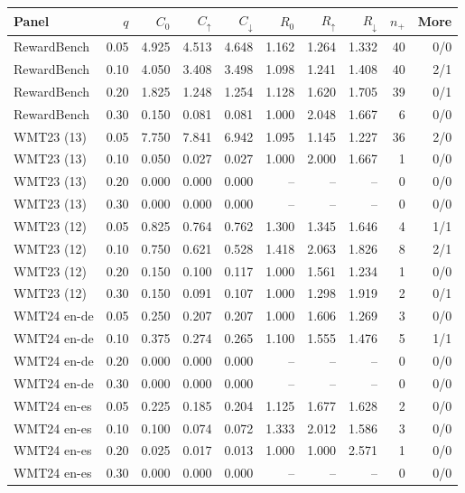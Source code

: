 \begin{table}[t]
\centering\small
\begin{tabular}{lrrrrrrrrr}
\toprule
Panel & $q$ & $C_0$ & $C_\uparrow$ & $C_\downarrow$ & $R_0$ & $R_\uparrow$ & $R_\downarrow$ & $n_+$ & More \\
\midrule
RewardBench & 0.05 & 4.925 & 4.513 & 4.648 & 1.162 & 1.264 & 1.332 & 40 & 0/0 \\
RewardBench & 0.10 & 4.050 & 3.408 & 3.498 & 1.098 & 1.241 & 1.408 & 40 & 2/1 \\
RewardBench & 0.20 & 1.825 & 1.248 & 1.254 & 1.128 & 1.620 & 1.705 & 39 & 0/1 \\
RewardBench & 0.30 & 0.150 & 0.081 & 0.081 & 1.000 & 2.048 & 1.667 & 6 & 0/0 \\
WMT23 (13) & 0.05 & 7.750 & 7.841 & 6.942 & 1.095 & 1.145 & 1.227 & 36 & 2/0 \\
WMT23 (13) & 0.10 & 0.050 & 0.027 & 0.027 & 1.000 & 2.000 & 1.667 & 1 & 0/0 \\
WMT23 (13) & 0.20 & 0.000 & 0.000 & 0.000 & -- & -- & -- & 0 & 0/0 \\
WMT23 (13) & 0.30 & 0.000 & 0.000 & 0.000 & -- & -- & -- & 0 & 0/0 \\
WMT23 (12) & 0.05 & 0.825 & 0.764 & 0.762 & 1.300 & 1.345 & 1.646 & 4 & 1/1 \\
WMT23 (12) & 0.10 & 0.750 & 0.621 & 0.528 & 1.418 & 2.063 & 1.826 & 8 & 2/1 \\
WMT23 (12) & 0.20 & 0.150 & 0.100 & 0.117 & 1.000 & 1.561 & 1.234 & 1 & 0/0 \\
WMT23 (12) & 0.30 & 0.150 & 0.091 & 0.107 & 1.000 & 1.298 & 1.919 & 2 & 0/1 \\
WMT24 en-de & 0.05 & 0.250 & 0.207 & 0.207 & 1.000 & 1.606 & 1.269 & 3 & 0/0 \\
WMT24 en-de & 0.10 & 0.375 & 0.274 & 0.265 & 1.100 & 1.555 & 1.476 & 5 & 1/1 \\
WMT24 en-de & 0.20 & 0.000 & 0.000 & 0.000 & -- & -- & -- & 0 & 0/0 \\
WMT24 en-de & 0.30 & 0.000 & 0.000 & 0.000 & -- & -- & -- & 0 & 0/0 \\
WMT24 en-es & 0.05 & 0.225 & 0.185 & 0.204 & 1.125 & 1.677 & 1.628 & 2 & 0/0 \\
WMT24 en-es & 0.10 & 0.100 & 0.074 & 0.072 & 1.333 & 2.012 & 1.586 & 3 & 0/0 \\
WMT24 en-es & 0.20 & 0.025 & 0.017 & 0.013 & 1.000 & 1.000 & 2.571 & 1 & 0/0 \\
WMT24 en-es & 0.30 & 0.000 & 0.000 & 0.000 & -- & -- & -- & 0 & 0/0 \\

\end{tabular}
\end{table}
